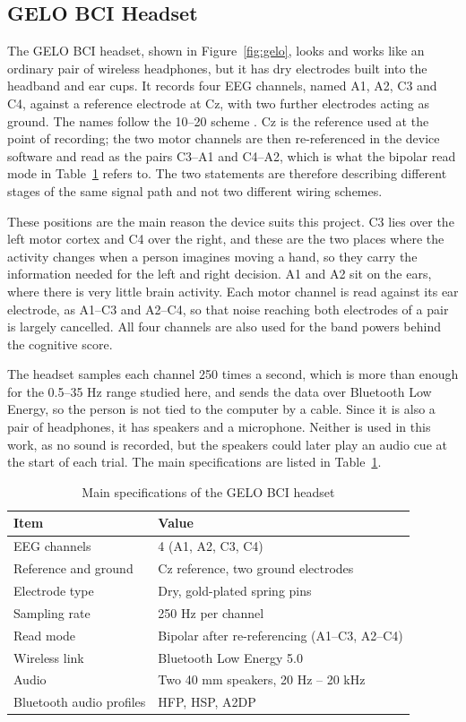 \subsection{GELO BCI Headset}
The GELO BCI headset, shown in Figure~\ref{fig:gelo}, looks and works like an ordinary pair
of wireless headphones, but it has dry electrodes built into the headband and ear cups.
It records four EEG channels, named A1, A2, C3 and C4, against a reference electrode at Cz,
with two further electrodes acting as ground. The names follow the 10--20 scheme
\cite{gelo2026manual}. Cz is the reference used at the point of recording; the two motor
channels are then re-referenced in the device software and read as the pairs C3--A1 and
C4--A2, which is what the bipolar read mode in Table~\ref{tab:gelo_spec} refers to. The
two statements are therefore describing different stages of the same signal path and not
two different wiring schemes.

These positions are the main reason the device suits this project. C3 lies over the left
motor cortex and C4 over the right, and these are the two places where the activity
changes when a person imagines moving a hand, so they carry the information needed for the
left and right decision. A1 and A2 sit on the ears, where there is very little brain
activity. Each motor channel is read against its ear electrode, as A1--C3 and A2--C4, so
that noise reaching both electrodes of a pair is largely cancelled. All four channels are
also used for the band powers behind the cognitive score.

The headset samples each channel 250 times a second, which is more than enough for the
0.5--35 Hz range studied here, and sends the data over Bluetooth Low Energy, so the
person is not tied to the computer by a cable. Since it is also a pair of headphones, it
has speakers and a microphone. Neither is used in this work, as no sound is recorded, but
the speakers could later play an audio cue at the start of each trial. The main
specifications are listed in Table~\ref{tab:gelo_spec}.

\begin{table}[!htbp]
\centering
\caption{Main specifications of the GELO BCI headset \cite{gelo2026manual}}
\label{tab:gelo_spec}
\begin{tabular}{|l|l|}
\hline
\textbf{Item} & \textbf{Value} \\
\hline
EEG channels & 4 (A1, A2, C3, C4) \\
\hline
Reference and ground & Cz reference, two ground electrodes \\
\hline
Electrode type & Dry, gold-plated spring pins \\
\hline
Sampling rate & 250 Hz per channel \\
\hline
Read mode & Bipolar after re-referencing (A1--C3, A2--C4) \\
\hline
Wireless link & Bluetooth Low Energy 5.0 \\
\hline
Audio & Two 40 mm speakers, 20 Hz -- 20 kHz \\
\hline
Bluetooth audio profiles & HFP, HSP, A2DP \\
\hline
\end{tabular}
\end{table}

